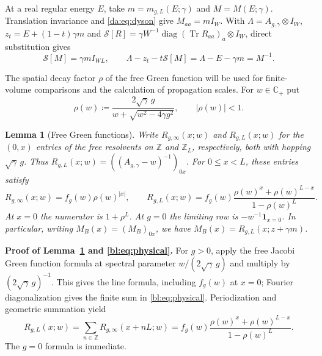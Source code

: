 \documentclass[11pt]{article}
\numberwithin{equation}{section}
\newtheorem{lemma}[theorem]{Lemma}
\theoremstyle{remark}
\newcommand{\Z}{\mathbb Z}
\newcommand{\C}{\mathbb C}
\newcommand{\Tr}{\operatorname{Tr}}
\newcommand{\diag}{\operatorname{diag}}
\begin{document}
At a real regular energy $E$, take $m=m_{g,L}(E;\gamma)$ and
$M=M(E;\gamma)$. Translation invariance and \eqref{da:eq:dyson}
give $M_{aa}=mI_W$. With $\Lambda=A_{g,\gamma}\otimes I_W$,
$z_t=E+(1-t)\gamma m$ and
$\mathcal S[R]=\gamma W^{-1}\diag(\Tr R_{aa})_a\otimes I_W$,
direct substitution gives
\begin{equation}\label{da:eq:characteristic-general}
 \mathcal S[M]=\gamma mI_{WL},\qquad
 \Lambda-z_t-t\mathcal S[M]=\Lambda-E-\gamma m=M^{-1}.
\end{equation}

The spatial decay factor $\rho$ of the free Green function will be used
for finite-volume comparisons and the calculation of propagation scales.
For $w\in\C_+$ put
\begin{equation}\label{da:eq:free-decay-factor}
 \rho(w)\coloneqq \frac{2\sqrt\gamma\,g}{w+\sqrt{w^2-4\gamma g^2}},\qquad
 |\rho(w)|<1.
\end{equation}

\begin{lemma}[Free Green functions]\label{da:lem:free-green}
Write $R_{g,\infty}(x;w)$ and $R_{g,L}(x;w)$ for the $(0,x)$ entries
of the free resolvents on $\Z$ and $\Z_L$, respectively, both with
hopping $\sqrt\gamma\,g$. Thus $R_{g,L}(x;w)=((A_{g,\gamma}-w)^{-1})_{0x}$.
For $0\le x<L$, these entries satisfy
\begin{equation}\label{bl:eq:free}
 R_{g,\infty}(x;w)=f_g(w)\rho(w)^{|x|},\qquad
 R_{g,L}(x;w)=f_g(w)
       \frac{\rho(w)^x+\rho(w)^{L-x}}{1-\rho(w)^L}.
\end{equation}
At $x=0$ the numerator is $1+\rho^L$.
At $g=0$ the limiting row is $-w^{-1}\mathbf1_{x=0}$.
In particular, writing $M_B(x)=(M_B)_{0x}$, we have
$M_B(x)=R_{g,L}(x;z+\gamma m)$.\end{lemma}

\noindent\textbf{Proof of Lemma~\ref{da:lem:free-green} and \eqref{bl:eq:physical}.}
For $g>0$, apply the free Jacobi Green function formula
\cite[Section~1.3, (1.121)]{Teschl} at spectral parameter
$w/(2\sqrt\gamma\,g)$ and multiply by $(2\sqrt\gamma\,g)^{-1}$.
This gives the line formula, including $f_g(w)$ at $x=0$;
Fourier diagonalization gives the finite sum in \eqref{bl:eq:physical}.
Periodization and geometric summation yield
\[
 R_{g,L}(x;w)=\sum_{n\in\Z}R_{g,\infty}(x+nL;w)
 =f_g(w)\frac{\rho(w)^x+\rho(w)^{L-x}}{1-\rho(w)^L}.
\]
The $g=0$ formula is immediate.
\end{document}
